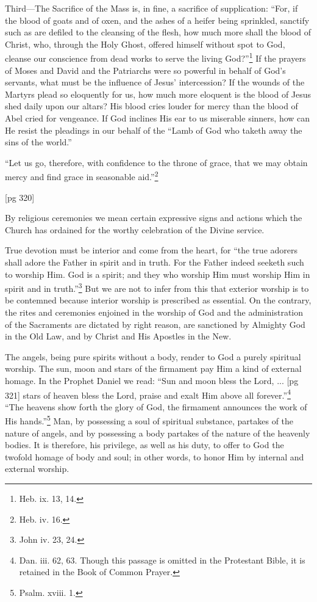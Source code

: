 Third—The Sacrifice of the Mass is, in fine, a
sacrifice of supplication: “For, if the blood of
goats and of oxen, and the ashes of a heifer being
sprinkled, sanctify such as are defiled to the
cleansing of the flesh, how much more shall
the blood of Christ, who, through the Holy Ghost,
offered himself without spot to God, cleanse our
conscience from dead works to serve the living
God?”\footnote{Heb. ix. 13,
14.} If the prayers of Moses and David and
the Patriarchs were so powerful in behalf of
God's servants, what must be the influence of
Jesus' intercession? If the wounds of the Martyrs
plead so eloquently for us, how much more eloquent
is the blood of Jesus shed daily upon our
altars? His blood cries louder for mercy than
the blood of Abel cried for vengeance. If God
inclines His ear to us miserable sinners, how can
He resist the pleadings in our behalf of the “Lamb
of God who taketh away the sins of the world.”

“Let us go, therefore, with confidence to the
throne of grace, that we may obtain mercy and
find grace in seasonable aid.”\footnote{Heb. iv. 16.}

[pg 320]


By religious ceremonies we mean certain
expressive signs and actions which the
Church has ordained for the worthy celebration
of the Divine service.

True devotion must be interior and come from
the heart, for “the true adorers shall adore the
Father in spirit and in truth. For the Father
indeed seeketh such to worship Him. God is a
spirit; and they who worship Him must worship
Him in spirit and in truth.”\footnote{John
iv. 23, 24.} But we are not to
infer from this that exterior worship is to be contemned
because interior worship is prescribed as
essential. On the contrary, the rites and ceremonies
enjoined in the worship of God and the
administration of the Sacraments are dictated by
right reason, are sanctioned by Almighty God in
the Old Law, and by Christ and His Apostles in
the New.

The angels, being pure spirits without a body,
render to God a purely spiritual worship. The
sun, moon and stars of the firmament pay Him a
kind of external homage. In the Prophet Daniel
we read: “Sun and moon bless the Lord, ...
[pg 321]
stars of heaven bless the Lord, praise and exalt
Him above all forever.”\footnote{Dan.
iii. 62, 63. Though this passage is omitted in the
Protestant Bible, it is retained in the Book of Common
Prayer.} “The heavens show
forth the glory of God, the firmament announces
the work of His hands.”\footnote{Psalm.
xviii. 1.} Man, by possessing a soul
of spiritual substance, partakes of the nature of
angels, and by possessing a body partakes of the
nature of the heavenly bodies. It is therefore, his
privilege, as well as his duty, to offer to God the
twofold homage of body and soul; in other words,
to honor Him by internal and external worship.

